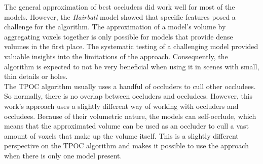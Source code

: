 \begin{figure}
    \caption{}
    \label{plt:culling-efficiency-voxel-node-count}
\end{figure}

\noindent
The general approximation of best occluders did work well for most of the models. However, the \emph{Hairball} model showed that specific 
features posed a challenge for the algorithm. The approximation of a model's volume by aggregating voxels together is only possible for 
models that provide dense volumes in the first place. The systematic testing of a challenging model provided valuable insights into the 
limitations of the approach. Consequently, the algorithm is expected to not be very beneficial when using it in scenes with small, thin 
details or holes.\\





\noindent
The \ac{TPOC} algorithm usually uses a handful of occluders to cull other occludees. So normally, there is no overlap between occluders and 
occludees. However, this work's approach uses a slightly different way of working with occluders and occludees. Because of their volumetric 
nature, the models can self-occlude, which means that the approximated volume can be used as an occluder to cull a vast amount of voxels that 
make up the volume itself. This is a slightly different perspective on the \ac{TPOC} algorithm and makes it possible to use the approach when 
there is only one model present. \\


